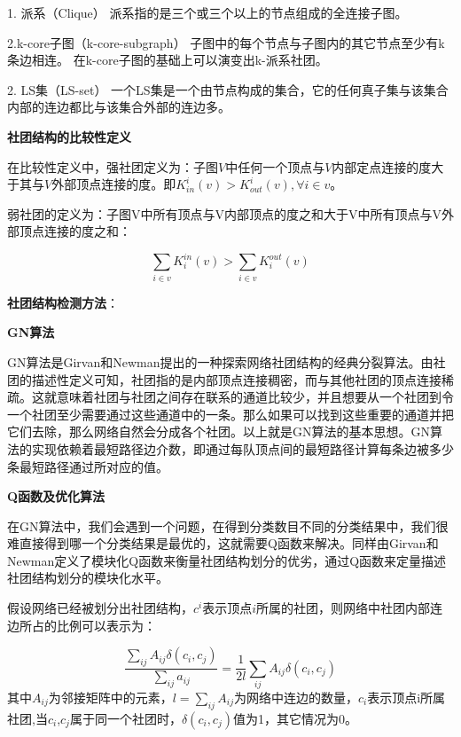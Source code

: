 \documentclass[a4paper,12pt,openany,oneside,utf-8]{ctexbook}
\begin{document}
    1.	派系（Clique）
    派系指的是三个或三个以上的节点组成的全连接子图。
    
    2.k-core子图（k-core-subgraph）
    子图中的每个节点与子图内的其它节点至少有k条边相连。
    在k-core子图的基础上可以演变出k-派系社团。
    
    2.	LS集（LS-set）
    一个LS集是一个由节点构成的集合，它的任何真子集与该集合内部的连边都比与该集合外部的连边多。
    
    \textbf{社团结构的比较性定义}
    
    在比较性定义中，强社团定义为：子图$V$中任何一个顶点与$V$内部定点连接的度大于其与$V$外部顶点连接的度。即$K^i_{in}(v)>K^i_{out}(v),$$\forall i\in v$。

    弱社团的定义为：子图V中所有顶点与V内部顶点的度之和大于V中所有顶点与V外部顶点连接的度之和：
    
    \begin{equation}
        \sum_{i\in v}K^{in}_{i}(v)>\sum_{i\in v}K_{i}^{out}(v)
    \end{equation}
	
	\textbf{社团结构检测方法}：
    
    \textbf{GN算法}
    
	GN算法是Girvan和Newman提出的一种探索网络社团结构的经典分裂算法。由社团的描述性定义可知，社团指的是内部顶点连接稠密，而与其他社团的顶点连接稀疏。这就意味着社团与社团之间存在联系的通道比较少，并且想要从一个社团到令一个社团至少需要通过这些通道中的一条。那么如果可以找到这些重要的通道并把它们去除，那么网络自然会分成各个社团。以上就是GN算法的基本思想。GN算法的实现依赖着最短路径边介数，即通过每队顶点间的最短路径计算每条边被多少条最短路径通过所对应的值。
    
    \textbf{Q函数及优化算法}
    
	在GN算法中，我们会遇到一个问题，在得到分类数目不同的分类结果中，我们很难直接得到哪一个分类结果是最优的，这就需要Q函数\cite{ref20}来解决。同样由Girvan和Newman定义了模块化Q函数来衡量社团结构划分的优劣，通过Q函数来定量描述社团结构划分的模块化水平。
    
    假设网络已经被划分出社团结构，$c^i$表示顶点$i$所属的社团，则网络中社团内部连边所占的比例可以表示为：
    
    \begin{equation}
        \frac{\sum_{ij}A_{ij}\delta (c_{i},c_j)}{\sum_{ij}a_{ij}}=\frac{1}{2l}\sum_{ij}A_{ij}\delta(c_i,c_j)
    \end{equation}
    其中$A_{ij}$为邻接矩阵中的元素，$l=\sum_{ij}A_{ij}$为网络中连边的数量，$c_i$表示顶点i所属社团,当$c_i$,$c_j$属于同一个社团时，$\delta(c_i,c_j)$值为1，其它情况为0。
    
\end{document}
